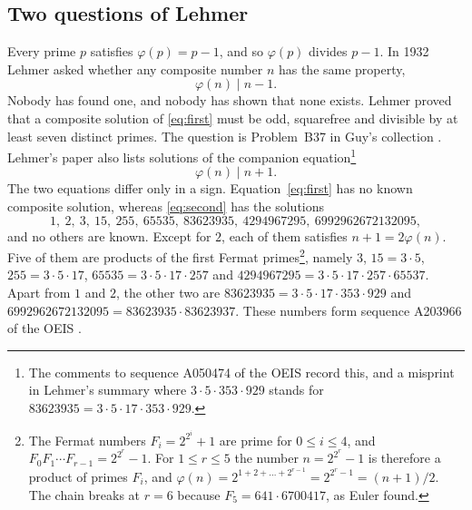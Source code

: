 \documentclass[screen,reqno]{aomart}
\numberwithin{equation}{section}
\theoremstyle{plain}
\theoremstyle{definition}
\theoremstyle{remark}
\begin{document}
\subsection{Two questions of Lehmer}
Every prime $p$ satisfies $\varphi(p)=p-1$, and so $\varphi(p)$ divides
$p-1$. In 1932 Lehmer \cite{Leh32} asked whether any composite number
$n$ has the same property,
\begin{equation}\label{eq:first}
  \varphi(n)\mid n-1 .
\end{equation}
Nobody has found one, and nobody has shown that none exists. Lehmer
proved that a composite solution of \eqref{eq:first} must be odd,
squarefree and divisible by at least seven distinct primes. The
question is Problem~B37 in Guy's collection \cite{Guy04}. Lehmer's
paper also lists solutions of the companion equation\footnote{The
comments to sequence A050474 of the OEIS \cite{OEIS} record this, and
a misprint in Lehmer's summary where $3\cdot5\cdot353\cdot929$ stands
for $83623935=3\cdot5\cdot17\cdot353\cdot929$.}
\begin{equation}\label{eq:second}
  \varphi(n)\mid n+1 .
\end{equation}
The two equations differ only in a sign. Equation~\eqref{eq:first}
has no known composite solution, whereas \eqref{eq:second} has the
solutions
\begin{equation}\label{eq:known}
  1,\ 2,\ 3,\ 15,\ 255,\ 65535,\ 83623935,\ 4294967295,\
  6992962672132095,
\end{equation}
and no others are known. Except for $2$, each of them satisfies
$n+1=2\varphi(n)$. Five of them are products of the first Fermat
primes\footnote{The Fermat numbers $F_i=2^{2^i}+1$ are prime
for $0\le i\le4$, and $F_0F_1\cdots F_{r-1}=2^{2^r}-1$. For $1\le r\le5$
the number $n=2^{2^r}-1$ is therefore a product of primes $F_i$, and
$\varphi(n)=2^{1+2+\dots+2^{r-1}}=2^{2^r-1}=(n+1)/2$. The chain breaks
at $r=6$ because $F_5=641\cdot6700417$, as Euler found.}, namely $3$, $15=3\cdot5$,
$255=3\cdot5\cdot17$, $65535=3\cdot5\cdot17\cdot257$ and
$4294967295=3\cdot5\cdot17\cdot257\cdot65537$. Apart from $1$ and
$2$, the other two are
$83623935=3\cdot5\cdot17\cdot353\cdot929$ and
$6992962672132095=83623935\cdot83623937$. These numbers form sequence
A203966 of the OEIS \cite{OEIS}.
\end{document}
